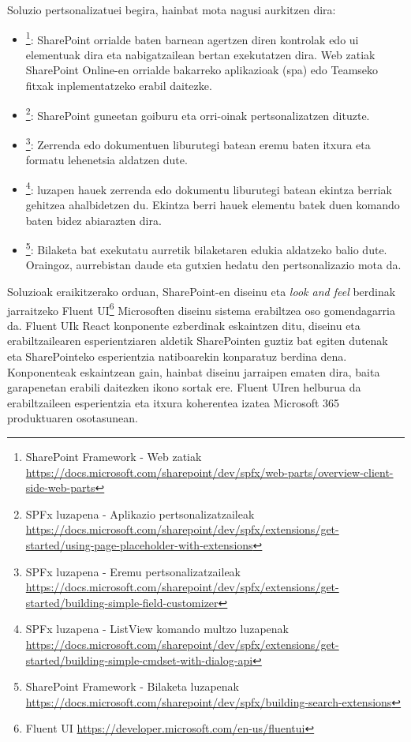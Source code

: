 Soluzio pertsonalizatuei begira, hainbat mota nagusi aurkitzen dira:
\begin{itemize}
  \item {}\footnote{SharePoint Framework - Web zatiak \url{https://docs.microsoft.com/sharepoint/dev/spfx/web-parts/overview-client-side-web-parts}}: SharePoint orrialde baten barnean agertzen diren kontrolak edo \acrshort{ui} elementuak dira eta
  nabigatzailean bertan exekutatzen dira. Web zatiak SharePoint Online-en orrialde bakarreko aplikazioak (\acrshort{spa}) edo
  Teamseko fitxak inplementatzeko erabil daitezke.
  \item {}\footnote{SPFx luzapena - Aplikazio pertsonalizatzaileak \url{https://docs.microsoft.com/sharepoint/dev/spfx/extensions/get-started/using-page-placeholder-with-extensions}}: SharePoint guneetan goiburu eta orri-oinak pertsonalizatzen dituzte.
  \item {}\footnote{SPFx luzapena - Eremu pertsonalizatzaileak \url{https://docs.microsoft.com/sharepoint/dev/spfx/extensions/get-started/building-simple-field-customizer}}: Zerrenda edo dokumentuen liburutegi batean eremu baten itxura eta formatu
  lehenetsia aldatzen dute.
  \item {}\footnote{SPFx luzapena - ListView komando multzo luzapenak \url{https://docs.microsoft.com/sharepoint/dev/spfx/extensions/get-started/building-simple-cmdset-with-dialog-api}}: luzapen hauek zerrenda edo dokumentu liburutegi batean ekintza berriak
  gehitzea ahalbidetzen du. Ekintza berri hauek elementu batek duen komando baten bidez abiarazten dira. 
  \item {}\footnote{SharePoint Framework - Bilaketa luzapenak \url{https://docs.microsoft.com/sharepoint/dev/spfx/building-search-extensions}}: Bilaketa bat exekutatu aurretik bilaketaren edukia aldatzeko balio dute. Oraingoz, aurrebistan daude eta gutxien hedatu den pertsonalizazio mota da.
\end{itemize}

Soluzioak eraikitzerako orduan, SharePoint-en diseinu eta \textit{look and feel} berdinak jarraitzeko
Fluent UI\footnote{Fluent UI \url{https://developer.microsoft.com/en-us/fluentui}} Microsoften diseinu sistema erabiltzea oso gomendagarria da.
Fluent UIk React konponente ezberdinak eskaintzen ditu, diseinu eta erabiltzailearen esperientziaren aldetik SharePointen guztiz
bat egiten dutenak eta SharePointeko esperientzia natiboarekin konparatuz berdina dena. Konponenteak eskaintzean gain, hainbat diseinu
jarraipen ematen dira, baita garapenetan erabili daitezken ikono sortak ere. Fluent UIren helburua da erabiltzaileen esperientzia eta
itxura koherentea izatea Microsoft 365 produktuaren osotasunean. 

